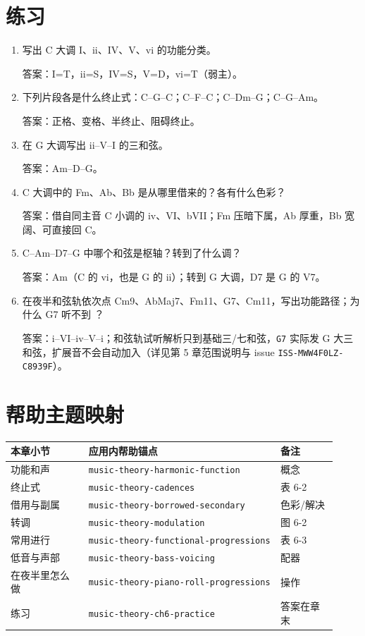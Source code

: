 \section{练习}


\begin{exercise}
\begin{enumerate}
  \item 写出 C 大调 I、ii、IV、V、vi 的功能分类。
  \par\noindent 答案：I=T，ii=S，IV=S，V=D，vi=T（弱主）。
  \item 下列片段各是什么终止式：C–G–C；C–F–C；C–Dm–G；C–G–Am。
  \par\noindent 答案：正格、变格、半终止、阻碍终止。
  \item 在 G 大调写出 ii–V–I 的三和弦。
  \par\noindent 答案：Am–D–G。
  \item C 大调中的 Fm、Ab、Bb 是从哪里借来的？各有什么色彩？
  \par\noindent 答案：借自同主音 C 小调的 iv、VI、bVII；Fm 压暗下属，Ab 厚重，Bb 宽阔、可直接回 C。
  \item C–Am–D7–G 中哪个和弦是枢轴？转到了什么调？
  \par\noindent 答案：Am（C 的 vi，也是 G 的 ii）；转到 G 大调，D7 是 G 的 V7。
  \item 在夜半和弦轨依次点 Cm9、AbMaj7、Fm11、G7、Cm11，写出功能路径；为什么 G7 听不到 ？
  \par\noindent 答案：i–VI–iv–V–i；和弦轨试听解析只到基础三/七和弦，\texttt{G7} 实际发 G 大三和弦，扩展音不会自动加入（详见第 5 章范围说明与 issue \texttt{ISS-MWW4F0LZ-C8939F}）。
\end{enumerate}
\end{exercise}

\section{帮助主题映射}

\begin{center}
\footnotesize
\begin{tabular}{p{0.22\linewidth}p{0.54\linewidth}p{0.16\linewidth}}
\toprule
本章小节 & 应用内帮助锚点 & 备注 \\
\midrule
功能和声 & \texttt{music-theory-harmonic-function} & 概念 \\
终止式 & \texttt{music-theory-cadences} & 表 6-2 \\
借用与副属 & \texttt{music-theory-borrowed-secondary} & 色彩/解决 \\
转调 & \texttt{music-theory-modulation} & 图 6-2 \\
常用进行 & \texttt{music-theory-functional-progressions} & 表 6-3 \\
低音与声部 & \texttt{music-theory-bass-voicing} & 配器 \\
在夜半里怎么做 & \texttt{music-theory-piano-roll-progressions} & 操作 \\
练习 & \texttt{music-theory-ch6-practice} & 答案在章末 \\
\bottomrule
\end{tabular}
\end{center}

